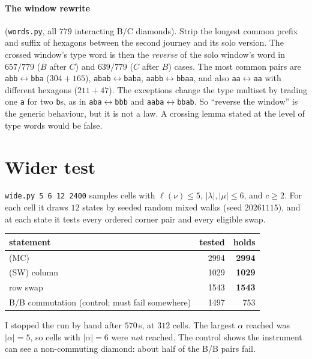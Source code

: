\documentclass[11pt]{article}
\theoremstyle{definition}
\begin{document}
\paragraph{The window rewrite} (\texttt{words.py}, all $779$ interacting B/C diamonds). Strip the longest common prefix and suffix
of hexagons between the second journey and its solo version. The crossed window's type word is then the \emph{reverse} of the solo
window's word in $657/779$ ($B$ after $C$) and $639/779$ ($C$ after $B$) cases. The most common pairs are
\texttt{abb}$\leftrightarrow$\texttt{bba} ($304+165$), \texttt{abab}$\leftrightarrow$\texttt{baba}, \texttt{aabb}$\leftrightarrow$\texttt{bbaa},
and also \texttt{aa}$\leftrightarrow$\texttt{aa} with different hexagons ($211+47$). The exceptions change the type multiset by trading
one \texttt{a} for two \texttt{b}s, as in \texttt{aba}$\leftrightarrow$\texttt{bbb} and \texttt{aaba}$\leftrightarrow$\texttt{bbab}. So ``reverse the window'' is
the generic behaviour, but it is not a law. A crossing lemma stated at the level of type words would be false.

\section{Wider test}\label{sec:wide}
\texttt{wide.py 5 6 12 2400} samples cells with $\ell(\nu)\le5$, $|\lambda|,|\mu|\le6$, and $c\ge2$. For each cell it draws $12$ states by seeded
random mixed walks (seed $20261115$), and at each state it tests every ordered corner pair and every eligible swap.
\begin{center}\begin{tabular}{lrr}\toprule
statement & tested & holds\\\midrule
(MC) & 2994 & \textbf{2994}\\
(SW) column & 1029 & \textbf{1029}\\
row swap & 1543 & \textbf{1543}\\
B/B commutation (control; must fail somewhere) & 1497 & 753\\\bottomrule
\end{tabular}\end{center}
I stopped the run by hand after $570$\,s, at $312$ cells. The largest $\alpha$ reached was $|\alpha|=5$, so cells with $|\alpha|=6$ were \emph{not}
reached. The control shows the instrument can see a non-commuting diamond: about half of the B/B pairs fail.
\end{document}
